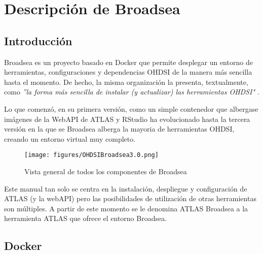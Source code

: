 \chapter{Descripción de Broadsea}


\section{Introducción}

Broadsea es un proyecto basado en Docker que permite desplegar un entorno de herramientas, configuraciones y dependencias OHDSI de la manera más sencilla hasta el momento. De hecho, la misma organización la presenta, textualmente, como \textit{''la forma más sencilla de instalar (y actualizar) las herramientas OHDSI"} \cite{Broadsea3PDF}.

Lo que comenzó, en su primera versión, como un simple contenedor que albergase imágenes de la WebAPI de ATLAS y RStudio ha evolucionado hasta la tercera versión en la que se Broadsea alberga la mayoria de herramientas OHDSI, creando un entorno virtual muy completo.

\begin{figure}[H]
    \centering
    \texttt{[image: figures/OHDSIBroadsea3.0.png]}
    \caption{Vista general de todos los componentes de Broadsea \cite{Broadsea3PPTX}}
    \label{fig:enter-label}
\end{figure}

Este manual tan solo se centra en la instalación, despliegue y configuración de ATLAS (y la webAPI) pero las posibilidades de utilización de otras herramientas son múltiples. A partir de este momento se le denomina ATLAS Broadsea a la herramienta ATLAS que ofrece el entorno Broadsea.

\section{Docker}

